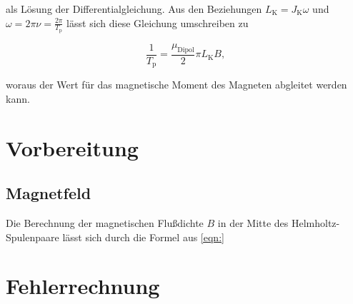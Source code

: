 \noindent als Lösung der Differentialgleichung. Aus den Beziehungen $L_\text{K} = J_\text{K}\omega$ und $\omega = 2\pi\nu
= \frac{2\pi}{T_\text{p}}$ lässt sich diese Gleichung umschreiben zu

\begin{equation}
\label{eqn:Praezession}
    \frac{1}{T_\text{p}} = \frac{\mu_\text{Dipol}}2\pi{L_\text{K}}B, 
\end{equation}

\noindent woraus der Wert für das magnetische Moment des Magneten abgleitet werden kann.

\section{Vorbereitung}

\subsection{Magnetfeld}
Die Berechnung der magnetischen Flußdichte $B$ in der Mitte des Helmholtz-Spulenpaare lässt sich durch die Formel aus 
\eqref{eqn:}

\section{Fehlerrechnung}
